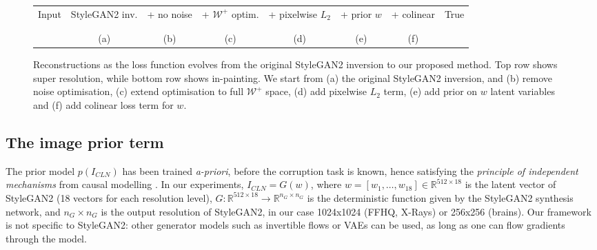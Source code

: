 \documentclass{article}
\newcommand{\inc}[1]{\raisebox{-.4\height}{\texttt{[image: \#1]}}}
\newcommand{\w}{2.5cm}
\newcommand{\mc}[1]{\mathbb{#1}}
\newcommand{\wplus}{$\mathcal{W}^{+}$ }
\begin{document}
\newcommand{\nrE}{0014}
\newcommand{\nrEtwo}{0005}
\newcommand{\nrEthree}{0012}
\newcommand{\nrEfour}{0014}

\newcommand{\nrEI}{0000}



\renewcommand{\w}{1.75cm}

\newcommand{\fnt}{\fontsize{7}{9}\selectfont}

\fboxsep=-0.3pt

\begin{figure*}
\centering
\setlength{\tabcolsep}{0pt}
\begin{tabu}{cccccccc}
\rowfont{\fnt} Input & StyleGAN2 inv. & + no noise & + \wplus optim. & + pixelwise $L_2$ & + prior $w$ & + colinear & True\\
 \inc{\ei{\nrE}} &  \inc{\eo{\nrE}} & \inc{\en{\nrE}} & \inc{\ew{\nrE}} & \inc{\el{\nrE}} & \inc{\ep{\nrE}} & \inc{\ec{\nrE}} & \inc{\eh{\nrE}}\\
\inc{\eii{\nrEI}} &  \inc{\eio{\nrEI}} & \inc{\ein{\nrEI}} & \inc{\eiw{\nrEI}} & \inc{\eil{\nrEI}} & \inc{\eip{\nrEI}} & \inc{\eic{\nrEI}} & \inc{\eih{\nrEI}}\\
\rowfont{\fnt} &  (a) & (b) & (c) & (d) & (e) & (f) & \\
\end{tabu}
\caption{Reconstructions as the loss function evolves from the original StyleGAN2 inversion to our proposed method. Top row shows super resolution, while bottom row shows in-painting. We start from (a) the original StyleGAN2 inversion, and (b) remove noise optimisation, (c) extend optimisation to full \wplus space, (d) add pixelwise $L_2$ term, (e) add prior on $w$ latent variables and (f) add colinear loss term for $w$. }
\label{evolution}
\end{figure*}
 
\subsection{The image prior term}  
\label{prior}
The prior model $p(I_{CLN})$ has been trained \emph{a-priori}, before the corruption task is known, hence satisfying the \emph{principle of independent mechanisms} from causal modelling \cite{peters2017elements}. In our experiments, $I_{CLN} = G(w)$, where $w = [w_1, \dots, w_{18}] \in \mc{R}^{512 \times 18}$ is the latent vector of StyleGAN2 (18 vectors for each resolution level), $G:\mc{R}^{512 \times 18} \to \mc{R}^{n_G \times n_G}$ is the deterministic function given by the StyleGAN2 synthesis network, and $n_G \times n_G$ is the output resolution of StyleGAN2, in our case 1024x1024 (FFHQ, X-Rays) or 256x256 (brains). Our framework is not specific to StyleGAN2: other generator models such as invertible flows \cite{dinh2016density,kingma2018glow} or VAEs \cite{kingma2013auto} can be used, as long as one can flow gradients through the model. 
\end{document}
